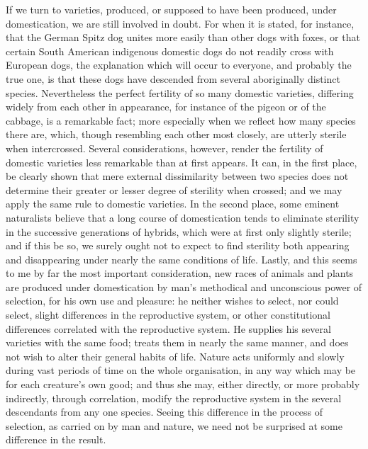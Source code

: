 If we turn to varieties, produced, or supposed to have been produced, under domestication, we are still involved in doubt. For when it is stated, for instance, that the German Spitz dog unites more easily than other dogs with foxes, or that certain South American indigenous domestic dogs do not readily cross with European dogs, the explanation which will occur to everyone, and probably the true one, is that these dogs have descended from several aboriginally distinct species. Nevertheless the perfect fertility of so many domestic varieties, differing widely from each other in appearance, for instance of the pigeon or of the cabbage, is a remarkable fact; more especially when we reflect how many species there are, which, though resembling each other most closely, are utterly sterile when intercrossed. Several considerations, however, render the fertility of domestic varieties less remarkable than at first appears. It can, in the first place, be clearly shown that mere external dissimilarity between two species does not determine their greater or lesser degree of sterility when crossed; and we may apply the same rule to domestic varieties. In the second place, some eminent naturalists believe that a long course of domestication tends to eliminate sterility in the successive generations of hybrids, which were at first only slightly sterile; and if this be so, we surely ought not to expect to find sterility both appearing and disappearing under nearly the same conditions of life. Lastly, and this seems to me by far the most important consideration, new races of animals and plants are produced under domestication by man's methodical and unconscious power of selection, for his own use and pleasure: he neither wishes to select, nor could select, slight differences in the reproductive system, or other constitutional differences correlated with the reproductive system. He supplies his several varieties with the same food; treats them in nearly the same manner, and does not wish to alter their general habits of life. Nature acts uniformly and slowly during vast periods of time on the whole organisation, in any way which may be for each creature's own good; and thus she may, either directly, or more probably indirectly, through correlation, modify the reproductive system in the several descendants from any one species. Seeing this difference in the process of selection, as carried on by man and nature, we need not be surprised at some difference in the result.
